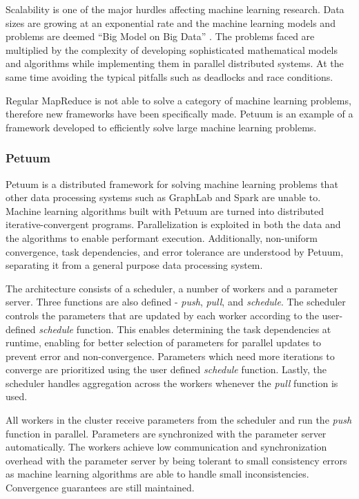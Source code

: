 \documentclass[12pt]{article}
\begin{document}
Scalability is one of the major hurdles affecting machine learning research. Data sizes are growing at an exponential rate and the machine learning models and problems are deemed ``Big Model on Big Data'' \cite{xing2015petuum}. The problems faced are multiplied by the complexity of developing sophisticated mathematical models and algorithms while implementing them in parallel distributed systems. At the same time avoiding the typical pitfalls such as deadlocks and race conditions.

Regular MapReduce is not able to solve a category of machine learning problems, therefore new frameworks have been specifically made. Petuum \cite{xing2015petuum} is an example of a framework developed to efficiently solve large machine learning problems.



\subsubsection{Petuum}

Petuum \cite{xing2015petuum} is a distributed framework for solving machine learning problems that other data processing systems such as GraphLab \cite{low2012graphlab} and Spark \cite{zaharia2010spark} are unable to. Machine learning algorithms built with Petuum are turned into distributed iterative-convergent programs. Parallelization is exploited in both the data and the algorithms to enable performant execution. Additionally, non-uniform convergence, task dependencies, and error tolerance are understood by Petuum, separating it from a general purpose data processing system.

The architecture consists of a scheduler, a number of workers and a parameter server. Three functions are also defined - \textit{push}, \textit{pull}, and \textit{schedule}. The scheduler controls the parameters that are updated by each worker according to the user-defined \textit{schedule} function. This enables determining the task dependencies at runtime, enabling for better selection of parameters for parallel updates to prevent error and non-convergence. Parameters which need more iterations to converge are prioritized using the user defined \textit{schedule} function. Lastly, the scheduler handles aggregation across the workers whenever the \textit{pull} function is used.

All workers in the cluster receive parameters from the scheduler and run the \textit{push} function in parallel. Parameters are synchronized with the parameter server automatically. The workers achieve low communication and synchronization overhead with the parameter server by being tolerant to small consistency errors as machine learning algorithms are able to handle small inconsistencies. Convergence guarantees are still maintained.
\end{document}

